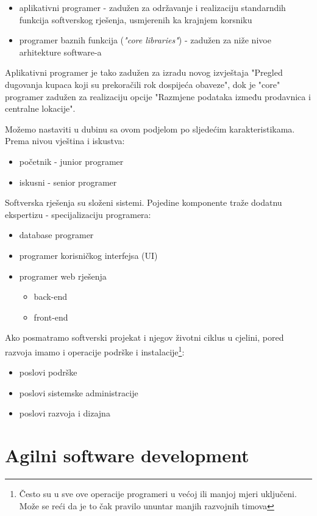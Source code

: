 \documentclass[times, utf8, seminar]{fit}
\begin{document}
\begin{itemize}
  \item aplikativni programer - zadužen za održavanje i realizaciju standarndih funkcija softverskog rješenja, usmjerenih ka krajnjem korsniku 
  \item programer baznih funkcija (\emph{"core libraries"}) - zadužen za niže nivoe arhitekture software-a
\end{itemize}

Aplikativni programer je tako zadužen za izradu novog izvještaja "Pregled dugovanja kupaca koji su prekoračili rok dospijeća obaveze",  dok je "core" programer zadužen za realizaciju opcije "Razmjene podataka između prodavnica i centralne lokacije".  

Možemo nastaviti u dubinu sa ovom podjelom po sljedećim karakteristikama. Prema nivou vještina i iskustva: 
\begin{itemize}
  \item početnik - junior programer
  \item iskusni - senior programer
\end{itemize}

Softverska rješenja su složeni sistemi. Pojedine komponente traže dodatnu ekspertizu - specijalizaciju programera:
\begin{itemize}
  \item database programer
  \item programer korisničkog interfejsa (UI)
  \item programer web rješenja
     \begin{itemize}
          \item back-end
          \item front-end
      \end{itemize}
\end{itemize}

Ako posmatramo softverski projekat i njegov životni ciklus u cjelini, pored razvoja imamo i operacije podrške i instalacije\footnote{Često su u sve ove operacije programeri u većoj ili manjoj mjeri uključeni. Može se reći da je to čak pravilo ununtar manjih razvojnih timova}: 
\begin{itemize}
   \item poslovi podrške
   \item poslovi sistemske administracije
   \item poslovi razvoja i dizajna
\end{itemize}

\section{Agilni software development}
\end{document}
